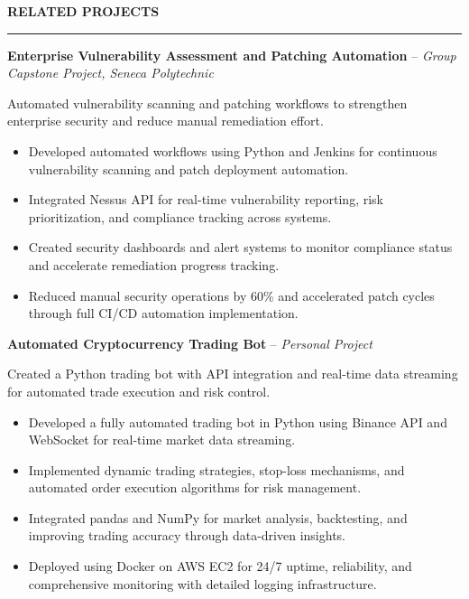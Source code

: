 \documentclass[10pt,letterpaper]{article}
\begin{document}
\vspace{6pt}

\textbf{RELATED PROJECTS}\\[-8pt]
\noindent\rule{\textwidth}{1pt}

\vspace{-2pt}

\textbf{Enterprise Vulnerability Assessment and Patching Automation} -- \emph{Group Capstone Project, Seneca Polytechnic }

\vspace{-1pt}

Automated vulnerability scanning and patching workflows to strengthen enterprise security and reduce manual remediation effort.
\vspace{-1pt}
\begin{itemize}
\item Developed automated workflows using Python and Jenkins for continuous vulnerability scanning and patch deployment automation.
\item Integrated Nessus API for real-time vulnerability reporting, risk prioritization, and compliance tracking across systems.
\item Created security dashboards and alert systems to monitor compliance status and accelerate remediation progress tracking.
\item Reduced manual security operations by 60\% and accelerated patch cycles through full CI/CD automation implementation.
\end{itemize}

\textbf{Automated Cryptocurrency Trading Bot} -- \emph{Personal Project}

\vspace{-1pt}

Created a Python trading bot with API integration and real-time data streaming for automated trade execution and risk control.
\vspace{-1pt}
\begin{itemize}
\item Developed a fully automated trading bot in Python using Binance API and WebSocket for real-time market data streaming.
\item Implemented dynamic trading strategies, stop-loss mechanisms, and automated order execution algorithms for risk management.
\item Integrated pandas and NumPy for market analysis, backtesting, and improving trading accuracy through data-driven insights.
\item Deployed using Docker on AWS EC2 for 24/7 uptime, reliability, and comprehensive monitoring with detailed logging infrastructure.
\end{itemize}
\end{document}
